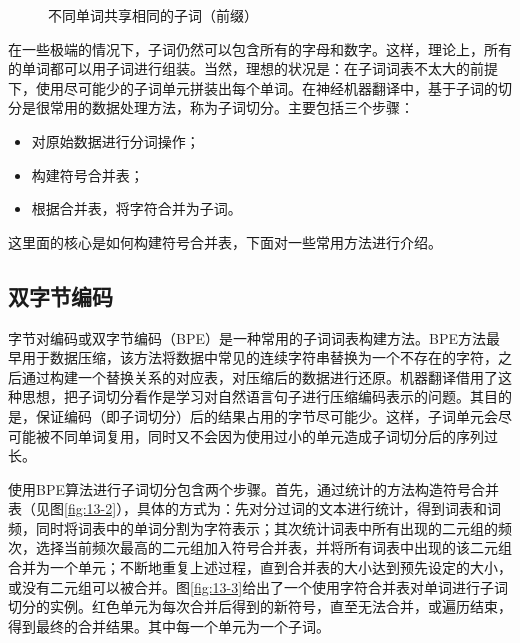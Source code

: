 \begin{figure}[htp]
\centering

\caption{不同单词共享相同的子词（前缀）}
\label{fig:13-1}
\end{figure}

\parinterval 在一些极端的情况下，子词仍然可以包含所有的字母和数字。这样，理论上，所有的单词都可以用子词进行组装。当然，理想的状况是：在子词词表不太大的前提下，使用尽可能少的子词单元拼装出每个单词。在神经机器翻译中，基于子词的切分是很常用的数据处理方法，称为子词切分。主要包括三个步骤：

\begin{itemize}
\vspace{0.5em}
\item 对原始数据进行分词操作；
\vspace{0.5em}
\item 构建符号合并表；
\vspace{0.5em}
\item 根据合并表，将字符合并为子词。
\vspace{0.5em}
\end{itemize}

\parinterval 这里面的核心是如何构建符号合并表，下面对一些常用方法进行介绍。


\subsection{双字节编码}

\parinterval 字节对编码或双字节编码（BPE）是一种常用的子词词表构建方法。BPE方法最早用于数据压缩，该方法将数据中常见的连续字符串替换为一个不存在的字符，之后通过构建一个替换关系的对应表，对压缩后的数据进行还原。机器翻译借用了这种思想，把子词切分看作是学习对自然语言句子进行压缩编码表示的问题。其目的是，保证编码（即子词切分）后的结果占用的字节尽可能少。这样，子词单元会尽可能被不同单词复用，同时又不会因为使用过小的单元造成子词切分后的序列过长。

\parinterval 使用BPE算法进行子词切分包含两个步骤。首先，通过统计的方法构造符号合并表（见图\ref{fig:13-2}），具体的方式为：先对分过词的文本进行统计，得到词表和词频，同时将词表中的单词分割为字符表示；其次统计词表中所有出现的二元组的频次，选择当前频次最高的二元组加入符号合并表，并将所有词表中出现的该二元组合并为一个单元；不断地重复上述过程，直到合并表的大小达到预先设定的大小，或没有二元组可以被合并。图\ref{fig:13-3}给出了一个使用字符合并表对单词进行子词切分的实例。红色单元为每次合并后得到的新符号，直至无法合并，或遍历结束，得到最终的合并结果。其中每一个单元为一个子词。

